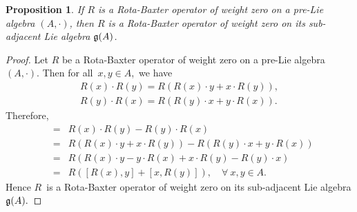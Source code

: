 \documentclass[12pt, reqno]{amsart}
\theoremstyle{plain}
\newtheorem{proposition}[theorem]{Proposition}
\begin{document}
\begin{proposition}\label{rb on pre-Lie and Lie}
If $R$ is a Rota-Baxter operator of weight zero on a pre-Lie algebra $(A,\cdot)$, then $R$ is
a Rota-Baxter operator of weight zero on its sub-adjacent Lie algebra ${\frak g}(A)$.
\end{proposition}
\begin{proof}
Let $R$ be a Rota-Baxter operator of weight zero on a pre-Lie algebra $(A,\cdot)$. Then for all~$x, y \in A$,~we
have
\begin{eqnarray*}
 R(x)\cdot R(y)=R(R(x)\cdot y + x\cdot R(y)),\\
 R(y)\cdot R(x)=R(R(y)\cdot x + y\cdot R(x)).
\end{eqnarray*}
Therefore,
\begin{eqnarray*}
[R(x), R(y)]&=&R(x)\cdot R(y)-R(y)\cdot R(x)\\
&=&R(R(x)\cdot y + x\cdot R(y))-R(R(y)\cdot x + y\cdot R(x))\\
&=& R(R(x)\cdot y - y\cdot R(x) + x\cdot R(y)-R(y)\cdot x)\\
&=&R([R(x), y] + [x, R(y)]),\quad\forall~x, y \in A.
\end{eqnarray*}
Hence $R$~is a Rota-Baxter operator of weight zero on its sub-adjacent Lie algebra ${\frak g}(A).$
\end{proof}
\end{document}
